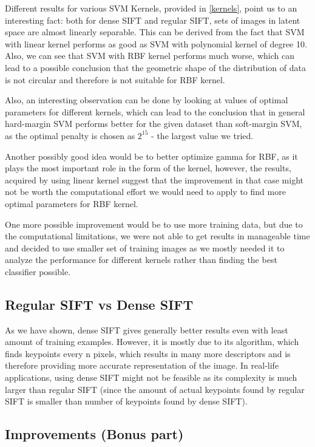 \documentclass{article}
\begin{document}
Different results for various SVM Kernels, provided in \cref{kernels}, point us to an interesting fact: both for dense SIFT and regular SIFT, sets of images in latent space are almost linearly separable. This can be derived from the fact that SVM with linear kernel performs as good as SVM with polynomial kernel of degree 10. Also, we can see that SVM with RBF kernel performs much worse, which can lead to a possible conclusion that the geometric shape of the distribution of data is not circular and therefore is not suitable for RBF kernel.

Also, an interesting observation can be done by looking at values of optimal parameters for different kernels, which can lead to the conclusion that in general hard-margin SVM performs better for the given dataset than soft-margin SVM, as the optimal penalty is chosen as $2^15$ - the largest value we tried.

Another possibly good idea would be to better optimize gamma for RBF, as it plays the most important role in the form of the kernel, however, the results, acquired by using linear kernel suggest that the improvement in that case might not be worth the computational effort we would need to apply to find more optimal parameters for RBF kernel.

One more possible improvement would be to use more training data, but due to the computational limitations, we were not able to get results in manageable time and decided to use smaller set of training images as we mostly needed it to analyze the performance for different kernels rather than finding the best classifier possible.

\subsection{Regular SIFT vs Dense SIFT}

As we have shown, dense SIFT gives generally better results even with least amount of training examples. However, it is mostly due to its algorithm, which finds keypoints every n pixels, which results in many more descriptors and is therefore providing more accurate representation of the image. In real-life applications, using dense SIFT might not be feasible as its complexity is much larger than regular SIFT  (since the amount of actual keypoints found by regular SIFT is smaller than number of keypoints found by dense SIFT).

\subsection{Improvements (Bonus part)}
\end{document}
